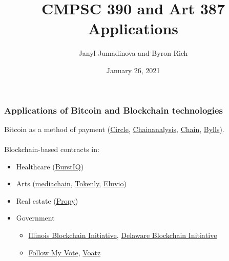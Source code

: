 \documentclass{beamer}
\title{CMPSC 390 and Art 387 \\ Applications}
\author{Janyl Jumadinova  and Byron Rich}
\date{January 26, 2021}
\begin{document}
\begin{frame}
  \titlepage
\end{frame}

\begin{frame}
  \frametitle{Applications of Bitcoin and Blockchain technologies}
  Bitcoin as a method of payment (\href{https://www.circle.com}{Circle}, \href{https://www.chainalysis.com/}{Chainanalysis}, \href{https://chain.com/}{Chain}, \href{https://bylls.com}{Bylls}). \\ $ $ \\
  \pause
  Blockchain-based contracts in:
	\begin{itemize}
		\item Healthcare (\href{https://www.burstiq.com/}{BurstIQ}) \pause
		\item Arts (\href{http://www.mediachain.io/}{mediachain}, \href{https://tokenly.com}{Tokenly}, \href{https://eluv.io/}{Eluvio}) \pause
		\item Real estate (\href{https://propy.com}{Propy}) \pause
		\item Government 
		\begin{itemize}
			\item \href{https://www2.illinois.gov/sites/doit/pages/BlockChainInitiative.aspx}{Illinois Blockchain Initiative}, \href{https://www.prnewswire.com/news-releases/governor-markell-launches-delaware-blockchain-initiative-300260672.html}{Delaware Blockchain Initiative}
			\pause
			\item \href{https://followmyvote.com/}{Follow My Vote}, \href{https://voatz.com/}{Voatz}
		\end{itemize}
	\end{itemize}
\end{frame}
\end{document}

